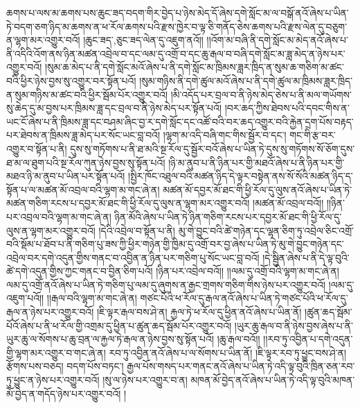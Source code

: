ཆགས་པ་ལས་མ་ཆགས་པས་ཆུང་ཟད་བདག་གིར་བྱེད་པ་ཉེས་མེད་དོ་ཞེས་དགེ་སློང་མ་ལ་བསྒོ་ནའོ་ཞེས་པ་ཡིན་ཏེ་བདག་ཅག་ཉིད་མ་ཆགས་ན་ཕ་རོལ་ཆགས་པའི་རྫས་ཁྱེར་བ་ལྟ་ཅི་གནོད་ཅེས་ཆགས་པའི་རྫས་ལེན་དུ་བཅུག་ན་ལྷག་མར་འགྱུར་བའོ། །{ཆུང་ཟད་,ཅུང་ཟད་}ལེན་དུ་འཇུག་ནའོ།། །།འོག་མ་བཞི་ནི་དགེ་སློང་མ་མེད་ནའོ་ཞེས་པ་ནི་འདིའི་འོག་ནས་ཉིན་མཚན་འབྲེལ་བ་དང་ལམ་དུ་འགྲོ་བ་དང་ཆུ་རྒལ་བ་བཞི་དགེ་སློང་མ་ཟླ་མེད་ན་ཉེས་པར་འགྱུར་བའོ། །སུམ་ཆ་མེད་པ་ནི་དགེ་སློང་མའོ་ཞེས་པ་ནི་དགེ་སློང་མ་ཁྲིམས་ཟླར་ཁྲིད་ན་སུམ་ཆ་གཅིག་མ་ཚང་བའི་ཕྱིར་ཉེས་བྱས་སུ་འགྱུར་བར་སྟོན་པའོ། །སུམ་གཉིས་ནི་དགེ་ཚུལ་མའོ་ཞེས་པ་ནི་དགེ་ཚུལ་མ་ཁྲིམས་ཟླར་ཁྲིད་ན་སུམ་གཉིས་མ་ཚང་བའི་ཕྱིར་སྦོམ་པོར་འགྱུར་བའོ། །མི་འདོད་པར་བྲལ་བ་ནི་ཉེས་མེད་ཅེས་པ་ནི་མལ་གཡོགས་སུ་ཆེད་དུ་མ་བྱས་པར་ཁྲིམས་ཟླ་དང་བྲལ་བ་ནི་ཉེས་མེད་པར་སྟོན་པའོ། །བར་ཆད་ཀྱིས་ཐེབས་པའི་དབང་གིས་ན་ཡང་ངོ་ཞེས་པ་ནི་ཁྲིམས་ཟླ་དང་བཤམ་ཞིང་བྱ་ར་དགེ་སློང་དང་འཚོ་བའི་བར་ཆད་འགྱུར་བའི་རྐྱེན་དྲག་པོས་བརྟད་པར་ཐེབས་ན་ཁྲིམས་ཟླ་མེད་པར་སོང་ཡང་བླ་བའོ། །ལྷག་མ་འདི་བཞི་གང་གིས་སྦྱོར་བ་དང་། གང་གི་རྩ་བར་འགྱུར་བ་སྟོན་པ་ནི། དུས་སུ་གཏོགས་པ་ནི་ཐ་མའི་སྔ་རོལ་དུ་སྦྱོར་བའོ་ཞེས་པ་ཡིན་ཏེ་དུས་སུ་གཏོགས་སོ་ཅོག་དུས་ཐ་མ་ལ་ཐུག་པའི་སྔ་རོལ་ཀུན་ཉེས་བྱས་སུ་སྟོན་པའོ། །ཉི་མ་ནུབ་པ་ནི་ཉིན་པར་གྱི་མཐའོ་ཞེས་པ་ནི་ཉིན་པར་གྱི་མཐའ་ཉི་མ་ནུབ་པ་ཡིན་པར་སྟོན་པའོ། །སྤྱིར་ཁོང་འཐུལ་བའི་མཚན་ཉིད་དེ་ལྟར་བསྟེན་ནས་སོ་སོའི་མཚན་ཉིད་ད་སྟོན་པ་ལ་མཚན་མོ་འབྲལ་བའི་ལྷག་མ་གང་ཞེ་ན། མཚན་མོ་དབྱར་མོ་ཐང་གི་ཕྱི་རོལ་དུ་ལུས་ནའོ་ཞེས་པ་ཡིན་ཏེ་མཚན་གཅིག་རངས་པ་དབྱར་མོ་ཐང་གི་ཕྱི་རོལ་དུ་ལུས་ན་ལྷག་མར་འགྱུར་བའོ། །མཚན་མོ་འབྲལ་བའོ།། །།ཉིན་པར་འབྲལ་བའི་ལྷག་མ་གང་ཞེ་ན། ཉིན་མོའི་ཞེས་པ་ཡིན་ཏེ་ཉིན་གཅིག་རངས་པར་དབྱར་མོ་ཐང་གི་ཕྱི་རོལ་དུ་ལུས་ན་ལྷག་མར་འགྱུར་བའོ། །དེའི་འབྲེལ་བ་སྟོན་པ་ནི། མུ་གེ་བྱུང་བའི་ཚེ་གཉེན་དང་ལྷན་ཅིག་ཏུ་འབྲེལ་ཅིང་འགྲོ་བའི་སྡོམ་པ་ཐོབ་པ་ནི་གཅིག་པུ་ཟས་ཀྱི་ཕྱིར་གཉེན་གྱི་ཁྱིམ་དུ་འགྲོ་བར་བྱ་ཞེས་པ་ཡིན་ཏེ་མུ་གེ་བྱུང་གཉེན་དང་འབྲེལ་བར་དགེ་འདུན་གྱིས་གནང་བ་འབྱིན་ན་ཉིན་པར་གཅིག་པུ་སོང་ཡང་བླ་བའོ། །དེ་སྦྱིན་ཞེས་པ་ནི་དེ་ལྟ་བུའི་ཚེ་དགེ་འདུན་གྱིས་ཀྱང་གནང་བ་བྱིན་ཅིག་པའོ། །ཉིན་པར་འབྲེལ་བའོ།། །།ལམ་དུ་འགྲོ་བའི་ལྷག་མ་གང་ཞེ་ན། ལམ་དུ་འགྲོ་ནའོ་ཞེས་པ་ཡིན་ཏེ་གཅིག་པུ་ལམ་དུ་ཞུགས་ན་རྒྱང་གྲགས་གཅིག་གིས་ཉེས་པར་འགྱུར་བའོ། །ལམ་དུ་འཇུག་པའོ།། །།རྒལ་བའི་ལྷག་མ་གང་ཞེ་ན། གཙང་པོའི་ཕ་རོལ་དུ་རྒལ་ནའོ་ཞེས་པ་ཡིན་ཏེ་གཙང་པོའི་ཕ་རོལ་དུ་རྒལ་ན་ཉེས་པར་འགྱུར་བའོ། །ཇི་ལྟར་རྒལ་བས་ཤེ་ན། རྐྱལ་ཏེ་ཕ་རོལ་དུ་ཕྱིན་ནའོ་ཞེས་པ་ཡིན་ནོ། །ཚུན་ཆད་སྦོམ་པོའོ་ཞེས་པ་ནི་ཕ་རོལ་གྱི་འགྲམ་དུ་ཕྱིན་པ་ཚུན་ཆད་སྦོམ་པོར་འགྱུར་བའོ། །ཡུར་ཆུ་རྒལ་བ་ནི་ཉེས་བྱས་ཞེས་པ་ནི་ཡུར་ཆུ་ལ་སོགས་པ་ཆུ་བྲན་ལ་རྐྱལ་ཏེ་རྒལ་ན་ཉེས་བྱས་སུ་སྟོན་པའོ། །ཆུ་རྒལ་བའོ།། །།རབ་ཏུ་འབྱིན་པ་དགེ་འདུན་གྱི་ལྷག་མར་འགྱུར་བ་གང་ཞེ་ན། རབ་ཏུ་འབྱིན་ནའོ་ཞེས་པ་ལ་སོགས་པ་ཡིན་ནོ། །ཇི་ལྟར་རབ་ཏུ་ཕྱུང་བས་ཤེ་ན། རྩོགས་པས་བཅད། བདག་པོས་བཏང་། རྒྱལ་པོས་གསད་པར་གནང་ནའོ་ཞེས་པ་ཡིན་ཏེ་འདི་ལྟ་བུའི་ཁྲིན་ཅན་རབ་ཏུ་ཕྱུང་ན་ཉེས་པར་འགྱུར་བའོ། །སུ་ལ་ཉེས་པར་འགྱུར་བ་ན། མཁན་མོ་བྱེད་ནའོ་ཞེས་པ་ཡིན་ཏེ་འདི་ལྟ་བུའི་མཁན་མོ་བྱེད་ན་གདོད་ཉེས་པར་འགྱུར་བའོ། །
